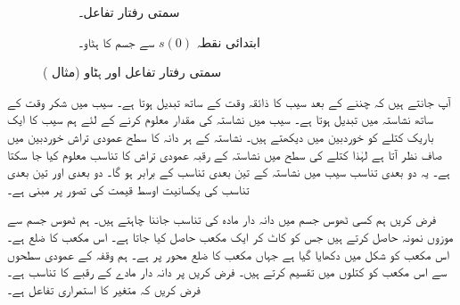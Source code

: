 \begin{figure}
\centering
\begin{subfigure}{0.45\textwidth}
\centering
{}
\caption{سمتی رفتار تفاعل۔}
\end{subfigure}\hfill
\begin{subfigure}{0.45\textwidth}
\centering
{}
\caption{ابتدائی نقطہ $s(0)$ سے جسم کا ہٹاو۔}
\end{subfigure}
\caption{سمتی رفتار تفاعل اور ہٹاو (مثال )}
\label{شکل_مثال_تکمل_استعمال_فاصلہ_ہٹاو}
\end{figure}

آپ جانتے ہیں کہ  چننے کے بعد سیب کا ذائقہ  وقت کے ساتھ تبدیل ہوتا ہے۔ سیب میں شکر وقت کے ساتھ نشاستہ میں تبدیل ہوتا ہے۔ سیب میں نشاستہ کی مقدار معلوم کرنے کے لئے ہم سیب کا ایک باریک کتلے  کو خوردبین میں دیکھتے ہیں۔ نشاستہ کے ہر دانہ کا سطح عمودی تراش خوردبین میں صاف نظر آتا ہے لہٰذا کتلے کی سطح میں نشاستہ کے رقبہ عمودی تراش کا تناسب معلوم کیا جا سکتا ہے۔ یہ دو بعدی تناسب سیب میں نشاستہ کے تین بعدی تناسب کے برابر ہو گا۔ دو بعدی اور تین بعدی تناسب کی یکسانیت  اوسط قیمت کی تصور پر مبنی ہے۔

فرض کریں ہم کسی ٹھوس  جسم میں دانہ دار مادہ کی تناسب جاننا چاہتے ہیں۔ ہم ٹھوس جسم سے موزوں نمونہ حاصل کرتے ہیں جس کو کاٹ کر ایک مکعب حاصل کیا جاتا ہے۔ اس مکعب کا ضلع  ہے۔ اس مکعب کو شکل  میں دکھایا گیا ہے جہاں مکعب کا ضلع  محور پر  ہے۔ ہم وقفہ  کے عمودی سطحوں سے اس مکعب کو کتلوں میں تقسیم کرتے ہیں۔ فرض کریں  پر دانہ دار مادے کے رقبے کا تناسب  ہے۔ فرض کریں کہ  متغیر  کا استمراری تفاعل ہے۔ 

